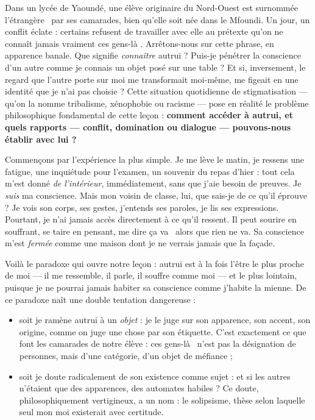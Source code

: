 \documentclass[11pt]{article}
\newcommand{\cle}[1]{{\popxbold\color{popdark}#1}}
\newcounter{popsec}
\newcounter{popsub}
\newcommand{\courssub}[1]{%
  \stepcounter{popsub}%
  \par\vspace{9pt}\noindent{\popxbold\fontsize{11.5}{13}\selectfont\color{popink}{\color{poporange}\thepopsec.\thepopsub}\hspace{6pt}#1}\par\nopagebreak\vspace{4pt}
}
\begin{document}
Dans un lycée de Yaoundé, une élève originaire du Nord-Ouest est surnommée \guillemotleft l'étrangère \guillemotright\ par ses camarades, bien qu'elle soit née dans le Mfoundi. Un jour, un conflit éclate : certains refusent de travailler avec elle au prétexte qu'\guillemotleft on ne connaît jamais vraiment ces gens-là \guillemotright. Arrêtons-nous sur cette phrase, en apparence banale. Que signifie \emph{connaître} autrui ? Puis-je pénétrer la conscience d'un autre comme je connais un objet posé sur une table ? Et si, inversement, le regard que l'autre porte sur moi me transformait moi-même, me figeait en une identité que je n'ai pas choisie ? Cette situation quotidienne de stigmatisation — qu'on la nomme tribalisme, xénophobie ou racisme — pose en réalité le problème philosophique fondamental de cette leçon : \textbf{comment accéder à autrui, et quels rapports — conflit, domination ou dialogue — pouvons-nous établir avec lui ?}

\courssub{Le problème : autrui est-il connaissable ?}

Commençons par l'expérience la plus simple. Je me lève le matin, je ressens une fatigue, une inquiétude pour l'examen, un souvenir du repas d'hier : tout cela m'est donné \emph{de l'intérieur}, immédiatement, sans que j'aie besoin de preuves. Je \emph{suis} ma conscience. Mais mon voisin de classe, lui, que sais-je de ce qu'il éprouve ? Je vois son corps, ses gestes, j'entends ses paroles, je lis ses expressions. Pourtant, je n'ai jamais accès directement à ce qu'il ressent. Il peut sourire en souffrant, se taire en pensant, me dire \guillemotleft ça va \guillemotright\ alors que rien ne va. Sa conscience m'est \emph{fermée} comme une maison dont je ne verrais jamais que la façade.

Voilà le paradoxe qui ouvre notre leçon : autrui est à la fois l'être le plus proche de moi — il me ressemble, il parle, il souffre comme moi — et le plus lointain, puisque je ne pourrai jamais habiter sa conscience comme j'habite la mienne. De ce paradoxe naît une double tentation dangereuse :

\begin{itemize}
\item soit je ramène autrui à un \emph{objet} : je le juge sur son apparence, son accent, son origine, comme on juge une chose par son étiquette. C'est exactement ce que font les camarades de notre élève : \guillemotleft ces gens-là \guillemotright\ n'est pas la désignation de personnes, mais d'une catégorie, d'un objet de méfiance ;
\item soit je doute radicalement de son existence comme sujet : et si les autres n'étaient que des apparences, des automates habiles ? Ce doute, philosophiquement vertigineux, a un nom : le \cle{solipsisme}, thèse selon laquelle seul mon moi existerait avec certitude.
\end{itemize}
\end{document}
